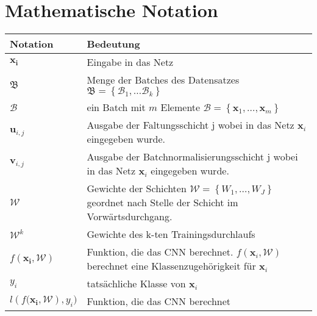 
\chapter*{Mathematische Notation} \label{Notation}

\newcommand{\tabdummy}{\midrule[0pt]}

\begin{tabular}{p{}p{}}
  \textbf{Notation} & \textbf{Bedeutung} \\ \toprule[1pt]
   $\mathbf{x_{i}}$ & Eingabe in das Netz \\ \tabdummy
   $\mathfrak{B}$ & Menge der Batches des Datensatzes $\mathfrak{B}=\left\{ \mathcal{B}_{1} , \ldots \mathcal{B}_{k}   \right\} $\\ \tabdummy
   $\mathcal{B}$ & ein Batch mit $m$ Elemente $\mathcal{B}=\left\{ \mathbf{x}_1, \ldots, \mathbf{x}_m \right\} $\\ \tabdummy
   $\mathbf{u}_{i,j}$ & Ausgabe der Faltungsschicht j wobei in das Netz $\mathbf{x}_i$ eingegeben wurde.\\ \tabdummy
   $\mathbf{v}_{i,j}$ & Ausgabe der Batchnormalisierungsschicht j wobei in das Netz $\mathbf{x}_i$ eingegeben wurde.\\ \tabdummy
   $\mathcal{W}$ & Gewichte der Schichten $\mathcal{W}= \left\{ W_1, \ldots, W_J \right\} $ geordnet nach Stelle der Schicht im Vorwärtsdurchgang. \\ \tabdummy
   $\mathcal{W}^k$ & Gewichte des k-ten Trainingsdurchlaufs  \\ \tabdummy
   $f\left( \mathbf{x_i}, \mathcal{W}\right) $ & Funktion, die das CNN berechnet. $f\left( \mathbf{x}_i, \mathcal{W}\right)$ berechnet eine Klassenzugehörigkeit für $\mathbf{x}_i$ \\ \tabdummy
   $y_i$ & tatsächliche Klasse von $\mathbf{x}_i$ \\ \tabdummy     
   $l\left(f( \mathbf{x_i}, \mathcal{W}\right), y_i) $ & Funktion, die das CNN berechnet  
\end{tabular}
